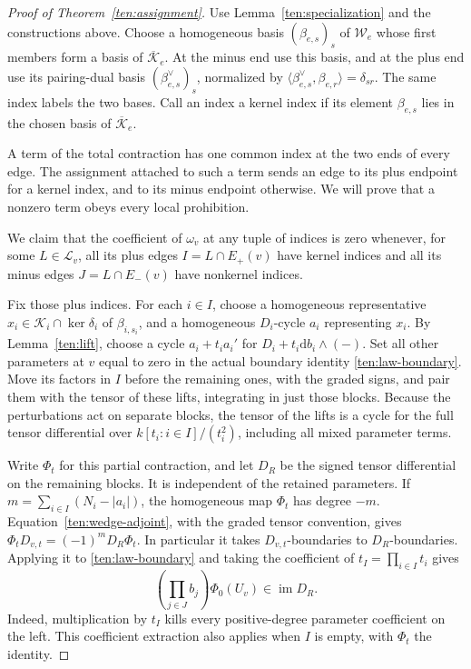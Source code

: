 \begin{proof}[Proof of Theorem~\ref{ten:assignment}]
Use Lemma~\ref{ten:specialization} and the constructions above.  Choose a
homogeneous basis \((\beta_{e,s})_s\) of \(\mathcal W_e\) whose first
members form a basis of \(\overline{\mathcal K}_e\).  At the minus end
use this basis, and at the plus end use its pairing-dual basis
\((\beta_{e,s}^{\vee})_s\), normalized by
\(\langle\beta_{e,s}^{\vee},\beta_{e,r}\rangle=\delta_{sr}\).
The same index labels the two bases.  Call an index a kernel index if
its element \(\beta_{e,s}\) lies in the chosen basis of
\(\overline{\mathcal K}_e\).

A term of the total contraction has one common index at the two ends
of every edge.  The assignment attached to such a term sends an edge
to its plus endpoint for a kernel index, and to its minus endpoint
otherwise.  We will prove that a nonzero term obeys every local prohibition.

We claim that the coefficient of \(\omega_v\) at any tuple of indices
is zero whenever, for some \(L\in\mathcal L_v\), all its plus edges
\(I=L\cap E_+(v)\) have kernel indices and all its minus edges
\(J=L\cap E_-(v)\) have nonkernel indices.

Fix those plus indices.  For each \(i\in I\), choose a homogeneous representative
\(x_i\in\mathcal K_i\cap\ker\delta_i\) of \(\beta_{i,s_i}\), and a
homogeneous \(D_i\)-cycle \(a_i\) representing \(x_i\).  By
Lemma~\ref{ten:lift}, choose a cycle \(a_i+t_i a_i'\) for
\(D_i+t_i\mathrm db_i\wedge(-)\).  Set all other parameters at \(v\)
equal to zero in the actual boundary identity
\eqref{ten:law-boundary}.  Move its factors in \(I\) before the remaining
ones, with the graded signs, and pair them with the tensor of these
lifts, integrating in just those blocks.  Because the perturbations
act on separate blocks, the tensor of the lifts is a cycle for the full
tensor differential over
\(k[t_i:i\in I]/(t_i^2)\), including all mixed parameter terms.

Write \(\Phi_t\) for this partial contraction, and let \(D_R\) be the
signed tensor differential on the remaining blocks.  It is independent
of the retained parameters.  If
\(m=\sum_{i\in I}(N_i-|a_i|)\), the homogeneous map \(\Phi_t\)
has degree \(-m\).  Equation~\eqref{ten:wedge-adjoint}, with the graded
tensor convention, gives
\(\Phi_tD_{v,t}=(-1)^mD_R\Phi_t\).  In particular it takes
\(D_{v,t}\)-boundaries to \(D_R\)-boundaries.  Applying it to
\eqref{ten:law-boundary} and taking the coefficient of
\(t_I=\prod_{i\in I}t_i\) gives
\begin{equation}\label{ten:contracted-kernel}
 \left(\prod_{j\in J}b_j\right)\Phi_0(U_v)
                                     \in\operatorname{im}D_R.
\end{equation}
Indeed, multiplication by \(t_I\) kills every positive-degree parameter
coefficient on the left.  This coefficient extraction also applies when
\(I\) is empty, with \(\Phi_t\) the identity.


\end{proof}
